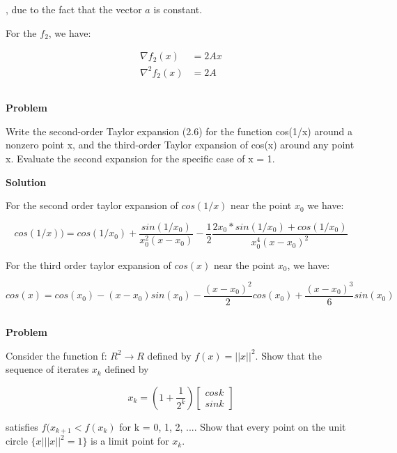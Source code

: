 \documentclass[a4paper,11pt]{article}
\numberwithin{equation}{section} %
\begin{document}
, due to the fact that the vector $a$ is constant.

For the $f_2$, we have:

\begin{align}
    \nabla f_2(x) &= 2Ax \\
    \nabla^2 f_2(x) &= 2A
\end{align}

\subsection{}

\textbf{Problem}

Write the second-order Taylor expansion (2.6) for the function cos(1/x) around
a nonzero point x, and the third-order Taylor expansion of cos(x) around any point x. Evaluate the second expansion for the specific case of x = 1.

\textbf{Solution}

For the second order taylor expansion of $cos(1/x)$ near the point $x_0$ we have:

\begin{equation}
cos(1/x)) = cos(1/x_0) + \frac{sin(1/x_0)}{x_0^2 (x-x_0)} - \frac{1}{2} \frac{2x_0*sin(1/x_0) + cos(1/x_0)}{x_0^4(x-x_0)^2}
\end{equation}

For the third order taylor expansion of $cos(x)$ near the point $x_0$, we have:

\begin{equation}
    cos(x) = cos(x_0) - (x-x_0)sin(x_0) - \frac{(x-x_0)^2}{2}cos(x_0) + \frac{(x-x_0)^3}{6}sin(x_0)
\end{equation}

\subsection{}

\textbf{Problem}

Consider the function f: $R^2 \rightarrow R$ defined by $f(x) = {||x||}^2$. Show that the sequence of iterates {$x_k$} defined by

\[x_k = (1 + \frac{1}{2^k}) \begin{bmatrix}
    cosk \\ sink
\end{bmatrix}\]

satisfies $f(x_{k+1} < f(x_k)$ for k = 0, 1, 2, .... Show that every point on the unit circle $\{x | {||x||}^2 = 1\}$ is a limit point for {$x_k$}.
\end{document}
